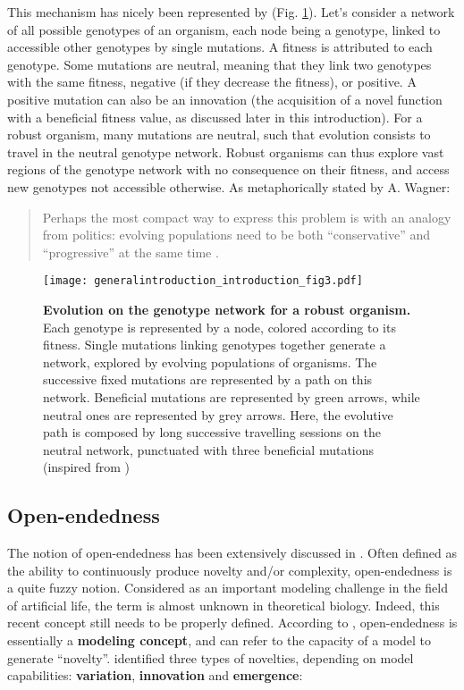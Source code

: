 This mechanism has nicely been represented by \cite{wagner-2008b} (Fig. \ref{fig:general_introduction:introduction:fig3}). Let's consider a network of all possible genotypes of an organism, each node being a genotype, linked to accessible other genotypes by single mutations. A fitness is attributed to each genotype. Some mutations are neutral, meaning that they link two genotypes with the same fitness, negative (if they decrease the fitness), or positive. A positive mutation can also be an innovation (the acquisition of a novel function with a beneficial fitness value, as discussed later in this introduction). For a robust organism, many mutations are neutral, such that evolution consists to travel in the neutral genotype network. Robust organisms can thus explore vast regions of the genotype network with no consequence on their fitness, and access new genotypes not accessible otherwise. As metaphorically stated by A. Wagner:
\begin{quote}
Perhaps the most compact way to express this problem is with an analogy from politics: evolving populations need to be both ``conservative'' and ``progressive'' at the same time \citep{wagner-2012}.
\end{quote}

\begin{figure}[!h]
\centering
\texttt{[image: generalintroduction\_introduction\_fig3.pdf]}
\caption[Evolution on the genotype network for a robust organism.]{{\bf Evolution on the genotype network for a robust organism.} Each genotype is represented by a node, colored according to its fitness. Single mutations linking genotypes together generate a network, explored by evolving populations of organisms. The successive fixed mutations are represented by a path on this network. Beneficial mutations are represented by green arrows, while neutral ones are represented by grey arrows. Here, the evolutive path is composed by long successive travelling sessions on the neutral network, punctuated with three beneficial mutations (inspired from \citealt{wagner-2008b})}
\label{fig:general_introduction:introduction:fig3}
\end{figure}


\subsection{Open-endedness}
The notion of open-endedness has been extensively discussed in \cite{banzhaf-et-al-2016}. Often defined as the ability to continuously produce novelty and/or complexity, open-endedness is a quite fuzzy notion. Considered as an important modeling challenge in the field of artificial life, the term is almost unknown in theoretical biology. Indeed, this recent concept still needs to be properly defined. According to \cite{banzhaf-et-al-2016}, open-endedness is essentially a \textbf{modeling concept}, and can refer to the capacity of a model to generate ``novelty''. \cite{banzhaf-et-al-2016} identified three types of novelties, depending on model capabilities: \textbf{variation}, \textbf{innovation} and \textbf{emergence}:

